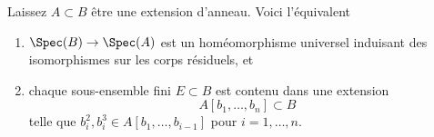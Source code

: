\begin{proposition}

\label{proposition-universal-homeomorphism-equal-residue-fields}
Laissez $A \subset B$ être une extension d'anneau. Voici l'équivalent
\begin{enumerate}
\item $\Spec(B) \to \Spec(A)$ est un homéomorphisme universel induisant des isomorphismes sur les corps résiduels, et
\item chaque sous-ensemble fini $E \subset B$ est contenu dans une extension $$
A[b_1, \ldots, b_n] \subset B
$$ telle que $b_i^2, b_i^3 \in A[b_1, \ldots, b_{i - 1}]$ pour $i = 1, \ldots, n$.
\end{enumerate}

\end{proposition}

